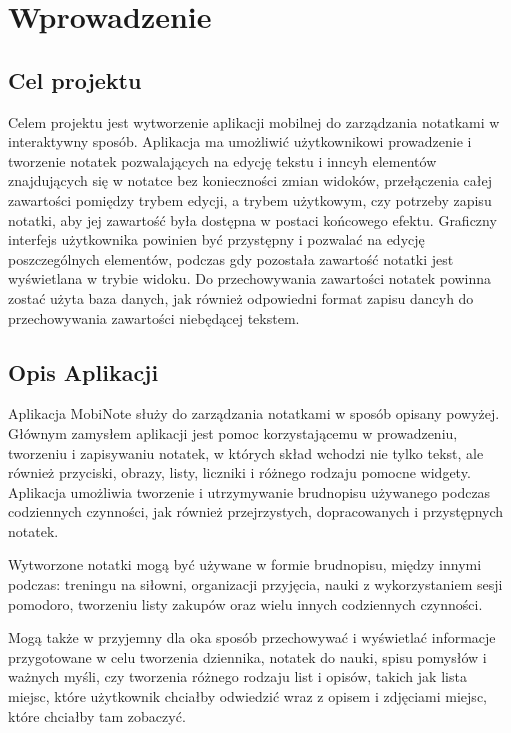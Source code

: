 \documentclass[shortabstract]{iithesis}
\author         {Bartosz Sobocki}
\begin{document}

\chapter{Wprowadzenie}

\section{Cel projektu}

Celem projektu jest wytworzenie aplikacji mobilnej do zarządzania notatkami w interaktywny sposób.
Aplikacja ma umożliwić użytkownikowi prowadzenie i tworzenie notatek pozwalających na edycję tekstu i inncyh elementów znajdujących się w notatce bez konieczności zmian widoków, przełączenia całej zawartości pomiędzy trybem edycji, a trybem użytkowym, czy potrzeby zapisu notatki, aby jej zawartość była dostępna w postaci końcowego efektu.
Graficzny interfejs użytkownika powinien być przystępny i pozwalać na edycję poszczególnych elementów, podczas gdy pozostała zawartość notatki jest wyświetlana w trybie widoku.
Do przechowywania zawartości notatek powinna zostać użyta baza danych, jak również odpowiedni format zapisu dancyh do przechowywania zawartości niebędącej tekstem. 

\section{Opis Aplikacji}

Aplikacja MobiNote służy do zarządzania notatkami w sposób opisany powyżej.
Głównym zamysłem aplikacji jest pomoc korzystającemu w prowadzeniu, tworzeniu i zapisywaniu notatek, w których skład wchodzi nie tylko tekst, ale również przyciski, obrazy, listy, liczniki i różnego rodzaju pomocne widgety.
Aplikacja umożliwia tworzenie i utrzymywanie brudnopisu używanego podczas codziennych czynności, jak również przejrzystych, dopracowanych i przystępnych  notatek.

Wytworzone notatki mogą być używane w formie brudnopisu, między innymi podczas: treningu na siłowni, organizacji przyjęcia, nauki z wykorzystaniem sesji pomodoro, tworzeniu listy zakupów oraz wielu innych codziennych czynności.

\pagebreak

Mogą także w przyjemny dla oka sposób przechowywać i wyświetlać informacje przygotowane w celu tworzenia dziennika, notatek do nauki, spisu pomysłów i ważnych myśli, czy tworzenia różnego rodzaju list i opisów, takich jak lista miejsc, które użytkownik chciałby odwiedzić wraz z opisem i zdjęciami miejsc, które chciałby tam zobaczyć.
\end{document}
